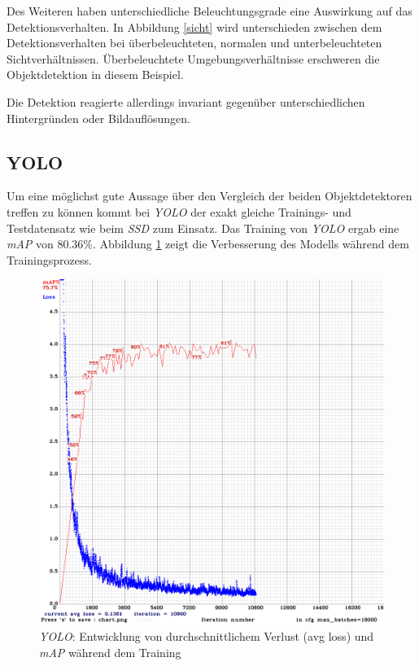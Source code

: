 Des Weiteren haben unterschiedliche Beleuchtungsgrade eine Auswirkung auf das Detektionsverhalten. In Abbildung \ref{sicht} wird unterschieden zwischen dem Detektionsverhalten bei überbeleuchteten, normalen und unterbeleuchteten Sichtverhältnissen. Überbeleuchtete Umgebungsverhältnisse erschweren die Objektdetektion in diesem Beispiel. 

Die Detektion reagierte allerdings invariant gegenüber unterschiedlichen Hintergründen oder Bildauflösungen.

\subsection*{YOLO}

Um eine möglichst gute Aussage über den Vergleich der beiden Objektdetektoren treffen zu können kommt bei \textit{YOLO} der exakt gleiche Trainings- und Testdatensatz wie beim \textit{SSD} zum Einsatz. Das Training von \textit{YOLO} ergab eine \textit{mAP} von 80.36\%. Abbildung \ref{yolo_result} zeigt die Verbesserung des Modells während dem Trainingsprozess. 

\begin{figure}[H]
	\begin{center}
		\includegraphics[width=13cm]{Bilder/yolo_result.png} 
		\caption{\textit{YOLO}: Entwicklung von durchschnittlichem Verlust (avg loss) und \textit{mAP} während dem Training}
		\label{yolo_result}
	\end{center}
\end{figure}

